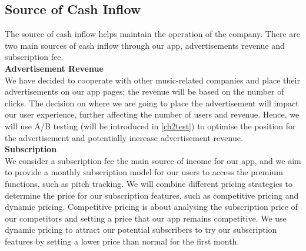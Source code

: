 \subsection{Source of Cash Inflow}
\label{Source of Cash Inflow}
The source of cash inflow helps maintain the operation of the company.  There are two main sources of cash inflow through our app, advertisements revenue and subscription fee. 
\\ \textbf{Advertisement Revenue}
\\ We have decided to cooperate with other music-related companies and place their advertisements on our app pages; the revenue will be based on the number of clicks. The decision on where we are going to place the advertisement will impact our user experience, further affecting the number of users and revenue. Hence, we will use A/B testing (will be introduced in \cref{ch2test}) to optimise the position for the advertisement and potentially increase advertisement revenue.
\\ \textbf{Subscription}
\\We consider a subscription fee the main source of income for our app, and we aim to provide a monthly subscription model for our users to access the premium functions, such as pitch tracking. We will combine different pricing strategies to determine the price for our subscription features, such as competitive pricing and dynamic pricing. Competitive pricing is about analysing the subscription price of our competitors and setting a price that our app remains competitive. We use dynamic pricing to attract our potential subscribers to try our subscription features by setting a lower price than normal for the first month.

